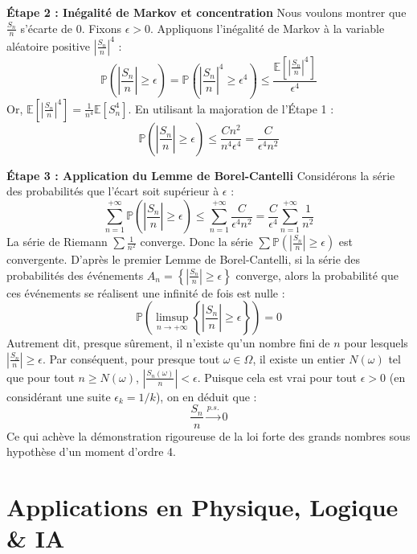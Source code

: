 \documentclass[11pt,a4paper]{article}
\begin{document}
\textbf{Étape 2 : Inégalité de Markov et concentration}
Nous voulons montrer que $\frac{S_n}{n}$ s'écarte de $0$. Fixons $\epsilon > 0$.
Appliquons l'inégalité de Markov à la variable aléatoire positive $\left|\frac{S_n}{n}\right|^4$ :
$$ \mathbb{P}\left( \left| \frac{S_n}{n} \right| \geq \epsilon \right) = \mathbb{P}\left( \left| \frac{S_n}{n} \right|^4 \geq \epsilon^4 \right) \leq \frac{\mathbb{E}\left[ \left| \frac{S_n}{n} \right|^4 \right]}{\epsilon^4} $$
Or, $\mathbb{E}\left[ \left| \frac{S_n}{n} \right|^4 \right] = \frac{1}{n^4} \mathbb{E}[S_n^4]$.
En utilisant la majoration de l'Étape 1 :
$$ \mathbb{P}\left( \left| \frac{S_n}{n} \right| \geq \epsilon \right) \leq \frac{C n^2}{n^4 \epsilon^4} = \frac{C}{\epsilon^4 n^2} $$

\textbf{Étape 3 : Application du Lemme de Borel-Cantelli}
Considérons la série des probabilités que l'écart soit supérieur à $\epsilon$ :
$$ \sum_{n=1}^{+\infty} \mathbb{P}\left( \left| \frac{S_n}{n} \right| \geq \epsilon \right) \leq \sum_{n=1}^{+\infty} \frac{C}{\epsilon^4 n^2} = \frac{C}{\epsilon^4} \sum_{n=1}^{+\infty} \frac{1}{n^2} $$
La série de Riemann $\sum \frac{1}{n^2}$ converge. Donc la série $\sum \mathbb{P}\left( \left| \frac{S_n}{n} \right| \geq \epsilon \right)$ est convergente.
D'après le premier Lemme de Borel-Cantelli, si la série des probabilités des événements $A_n = \left\{ \left| \frac{S_n}{n} \right| \geq \epsilon \right\}$ converge, alors la probabilité que ces événements se réalisent une infinité de fois est nulle :
$$ \mathbb{P}\left( \limsup_{n \to +\infty} \left\{ \left| \frac{S_n}{n} \right| \geq \epsilon \right\} \right) = 0 $$
Autrement dit, presque sûrement, il n'existe qu'un nombre fini de $n$ pour lesquels $\left| \frac{S_n}{n} \right| \geq \epsilon$.
Par conséquent, pour presque tout $\omega \in \Omega$, il existe un entier $N(\omega)$ tel que pour tout $n \geq N(\omega)$, $\left| \frac{S_n(\omega)}{n} \right| < \epsilon$.
Puisque cela est vrai pour tout $\epsilon > 0$ (en considérant une suite $\epsilon_k = 1/k$), on en déduit que :
$$ \frac{S_n}{n} \xrightarrow{p.s.} 0 $$
Ce qui achève la démonstration rigoureuse de la loi forte des grands nombres sous hypothèse d'un moment d'ordre 4. \qedsymbol


\section{Applications en Physique, Logique \& IA}
\end{document}

